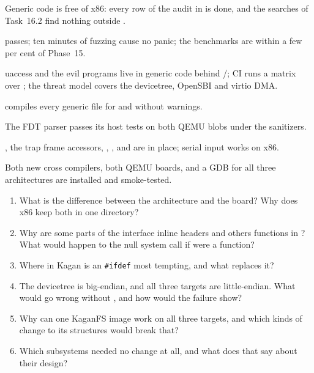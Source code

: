 \documentclass[11pt,a4paper]{article}
\begin{document}
\begin{milestonebox}
\begin{checklist}
  \item Generic code is free of x86: every row of the audit in  is done, and the searches of
        Task~16.2 find nothing outside .
  \item {} passes; ten minutes of fuzzing cause no panic; the benchmarks are within a few
        per cent of Phase~15.
  \item uaccess and the evil programs live in generic code behind /; CI runs a
        matrix over ; the threat model covers the devicetree, OpenSBI and virtio DMA.
  \item {} compiles every generic file for  and  without warnings.
  \item The FDT parser passes its host tests on both QEMU blobs under the sanitizers.
  \item {}, the trap frame accessors, , ,
         and  are in place; serial input works on x86.
  \item Both new cross compilers, both QEMU boards,  and a GDB for all three architectures are installed and
        smoke-tested.
\end{checklist}
\end{milestonebox}

\begin{questionbox}
\begin{enumerate}
  \item What is the difference between the architecture and the board? Why does x86 keep both in one directory?
  \item Why are some parts of the interface inline headers and others functions in ? What would
        happen to the null system call if  were a function?
  \item Where in Kagan is an \texttt{\#ifdef} most tempting, and what replaces it?
  \item The devicetree is big-endian, and all three targets are little-endian. What would go wrong without
        , and how would the failure show?
  \item Why can one KaganFS image work on all three targets, and which kinds of change to its structures would break
        that?
  \item Which subsystems needed no change at all, and what does that say about their design?
\end{enumerate}
\end{questionbox}
\end{document}
